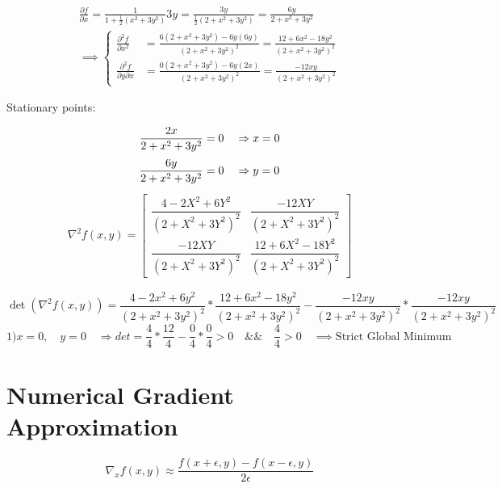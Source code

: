 \documentclass[12pt]{article}         %
\begin{document}
$$
\begin{aligned}
\frac {\partial f}{\partial x} = \frac{1}{1+\frac{1}{2}(x^2+3y^2)}3y= \frac{3y}{\frac{1}{2}(2+x^2+3y^2)}=\frac{6y}{2+x^2+3y^2}\\
\implies 
	\left\{
	\begin{aligned}
		\frac {\partial^2 f}{\partial x^2}&=\frac{6(2+x^2+3y^2)-6y(6y)}{(2+x^2+3y^2)^2}=
		 	\frac{12+6x^2-18y^2}{(2+x^2+3y^2)^2} \\
		\frac {\partial^2 f}{\partial y \partial x}&=\frac{0(2+x^2+3y^2)-6y(2x)}{(2+x^2+3y^2)^2}=
		 	\frac{-12xy}{(2+x^2+3y^2)^2} 
	 \end{aligned} 
	 \right.
\end{aligned}
$$

Stationary points:

$$
\frac{2x}{2+x^2+3y^2}=0 \quad\Rightarrow x=0\\
$$
$$
\frac{6y}{2+x^2+3y^2}=0 \quad\Rightarrow y=0\\
$$
\begin{gather}
\nabla^2 f(x,y) = 
  \begin{bmatrix}
   \dfrac{4 - 2X^2 +6Y^2}{(2 + X^2 + 3Y^2)^2} &
   \dfrac{-12XY}{(2 + X^2 + 3Y^2)^2}\\
   \dfrac{-12XY}{(2 + X^2 + 3Y^2)^2} &
   \dfrac{12 + 6X^2 - 18Y^2}{(2 + X^2 + 3Y^2)^2} 
   \end{bmatrix}
    \nonumber
\end{gather}

$$
\det\left(\nabla^2 f(x,y)\right)=\frac{4-2x^2+6y^2}{(2+x^2+3y^2)^2} * \frac{12+6x^2-18y^2}{(2+x^2+3y^2)^2} - \frac{-12xy}{(2+x^2+3y^2)^2} *  \frac{-12xy}{(2+x^2+3y^2)^2}
$$
$$
1) x=0, \quad y=0 \quad\Rightarrow det=\frac{4}{4}*\frac{12}{4}-\frac{0}{4}*\frac{0}{4} > 0  \quad \&\& \quad \frac{4}{4} > 0 \quad\implies \text{Strict Global Minimum}
$$



\section{Numerical Gradient Approximation}


\begin{equation}
	\nabla_x f(x,y) \approx \dfrac{f(x + \epsilon, y) - f(x - \epsilon, y)}{2\epsilon}
\end{equation}
\end{document}

